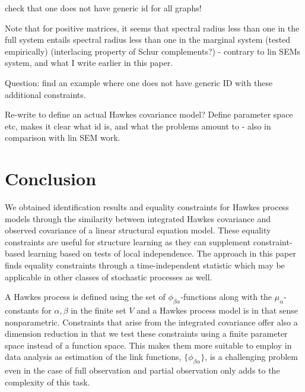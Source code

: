 \documentclass[accepted]{uai2021} %
\begin{document}
check that one does not have generic id for all graphs!

Note that for positive matrices, it seems that spectral radius less than one in 
the full system entails spectral radius less than one in the marginal system 
(tested empirically) (interlacing property of Schur complements?) - contrary to 
lin SEMs system, and what I write earlier in this paper.



Question: find an example where one does not have generic ID with these 
additional constraints.

Re-write to define an actual Hawkes covariance model? Define parameter space 
etc, makes it clear what id is, and what the problems amount to - also in 
comparison with lin SEM work.

\section{Conclusion}

We obtained identification results and equality constraints for Hawkes process 
models through the similarity between integrated Hawkes covariance and observed 
covariance of a linear structural equation model. These 
equality constraints are useful for structure learning as they can 
supplement constraint-based learning based on tests of local independence. The 
approach in this paper finds equality constraints through a time-independent 
statistic which may be applicable in other classes of stochastic processes as 
well.

A Hawkes process is defined using the set of $\phi_{\beta\alpha}$-functions 
along 
with the $\mu_\alpha$-constants for $\alpha,\beta$ in the finite set $V$ and a 
Hawkes process model is in that sense nonparametric.  Constraints that arise 
from the integrated covariance offer also a dimension reduction in that we  
test these constraints using a finite parameter space instead of a 
function space. This makes them more suitable to employ in data analysis 
as estimation of the link functions, $\{\phi_{\beta\alpha} \}$, is a 
challenging problem even in the case of full 
observation and partial observation only adds to the 
complexity of this task.





\begin{contributions} %

\end{contributions}
\end{document}
